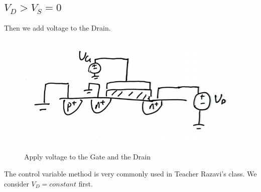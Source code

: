 \documentclass[fontset=windows]{article}
\begin{document}
\subsection*{$V_D>V_S=0$}

Then we add voltage to the Drain.

\begin{figure}[htbp]
    \centering
    \includegraphics[scale=0.6]{5.jpg}
    \captionsetup{labelformat=empty}
    \caption{Apply voltage to the Gate and the Drain}
    \label{5}
\end{figure}

The control variable method is very commonly used in Teacher Razavi’s class.
We consider $V_D=constant$ first.
\end{document}
